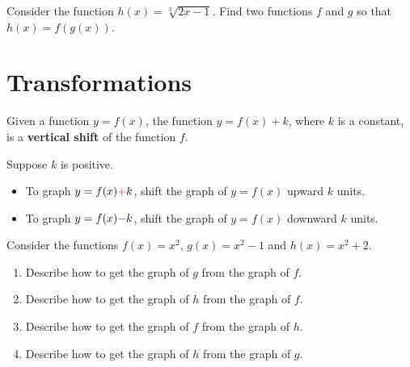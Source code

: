 \begin{exercise}
  Consider the function $h(x)=\sqrt[3]{2x-1}$. Find two functions $f$ and $g$ so that $h(x)=f(g(x))$.
\end{exercise}

\newpage

\section{Transformations}

\begin{definition}
  Given a function \(y=f(x)\), the function \(y=f(x)+k\), where \(k\) is a constant, is a \textbf{vertical shift} of the function \(f\). 
\end{definition}

\begin{howto}
  Suppose $k$ is positive. 
\begin{itemize}
  \item To graph $y=f(x) {\color{red} +}k$, shift the graph of $y=f(x)$ {\color{red}upward} $k$ units. 
  \item To graph $y=f(x) {\color{blue} -}k$, shift the graph of $y=f(x)$ {\color{blue}downward} $k$ units. 
\end{itemize}
\end{howto}

\begin{example}
  Consider the functions $f(x)=x^2$, $g(x)=x^2-1$ and $h(x)=x^2+2$.
  \begin{enumerate}
    \item Describe how to get the graph of $g$ from the graph of $f$.
    \item Describe how to get the graph of $h$ from the graph of $f$.
    \item Describe how to get the graph of $f$ from the graph of $h$.
    \item Describe how to get the graph of $h$ from the graph of $g$.
  \end{enumerate}
\end{example}




